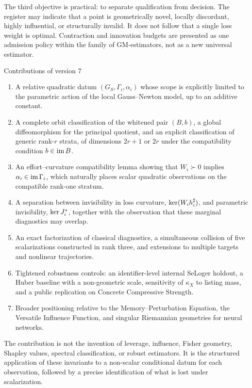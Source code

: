 The third objective is practical: to separate qualification from decision. The register may indicate that a point is geometrically novel, locally discordant, highly influential, or structurally invalid. It does not follow that a single loss weight is optimal. Contraction and innovation budgets are presented as one admission policy within the family of GM-estimators, not as a new universal estimator.

\begin{statementbox}{Contributions of version 7}
\begin{enumerate}
  \item A relative quadratic datum $(G_S,\Gamma_i,\alpha_i)$ whose scope is explicitly limited to the parametric action of the local Gauss--Newton model, up to an additive constant.
  \item A complete orbit classification of the whitened pair $(B,b)$, a global diffeomorphism for the principal quotient, and an explicit classification of generic rank-$r$ strata, of dimensions $2r+1$ or $2r$ under the compatibility condition $b\in\operatorname{im} B$.
  \item An effort--curvature compatibility lemma showing that $W_i\succ0$ implies $\alpha_i\in\operatorname{im}\Gamma_i$, which naturally places scalar quadratic observations on the compatible rank-one stratum.
  \item A separation between invisibility in loss curvature, $\operatorname{ker}(W_ih_i^\sharp)$, and parametric invisibility, $\operatorname{ker} J_i^*$, together with the observation that these marginal diagnostics may overlap.
  \item An exact factorization of classical diagnostics, a simultaneous collision of five scalarizations constructed in rank three, and extensions to multiple targets and nonlinear trajectories.
  \item Tightened robustness controls: an identifier-level internal SeLoger holdout, a Huber baseline with a non-geometric scale, sensitivity of $\kappa_X$ to listing mass, and a public replication on Concrete Compressive Strength.
  \item Broader positioning relative to the Memory--Perturbation Equation, the Versatile Influence Function, and singular Riemannian geometries for neural networks.
\end{enumerate}
\end{statementbox}

The contribution is not the invention of leverage, influence, Fisher geometry, Shapley values, spectral classification, or robust estimators. It is the structured application of these invariants to a non-scalar conditional datum for each observation, followed by a precise identification of what is lost under scalarization.

